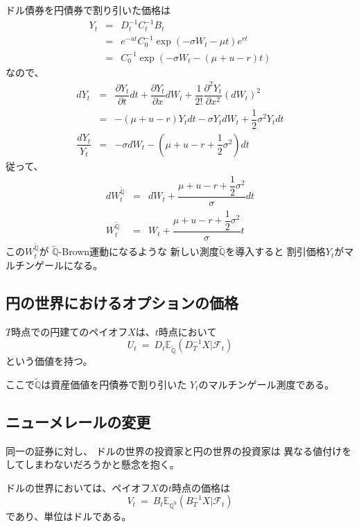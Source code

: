 \documentclass[uplatex,a4j,12pt,dvipdfmx]{jsarticle}
\begin{document}
ドル債券を円債券で割り引いた価格は
%
%
\begin{eqnarray*}
	Y_{t}
	&=&
	D^{-1}_{t}
	C^{-1}_{t}
	B_{t}
	\\ &=&
	e^{-ut}
	C_{0}^{-1}
	\exp ( - \sigma W_{t} - \mu t )
	e^{rt}
	\\ &=&
	C_{0}^{-1}
	\exp ( - \sigma W_{t} - (\mu + u -r) t )
\end{eqnarray*}
%
%
なので、
%
%
\begin{eqnarray*}
	d Y_{t}
	&=&
	\dfrac{\partial Y_{t}}{\partial t} dt
	+
	\dfrac{\partial Y_{t}}{\partial x} dW_{t}
	+
	\dfrac{1}{2!}
	\dfrac{\partial^{2} Y_{t}}{\partial x^{2}} (dW_{t})^{2}
	\\ &=&
	- (\mu + u -r) Y_{t} dt
	- \sigma Y_{t} d W_{t}
	+ \dfrac{1}{2} \sigma^{2} Y_{t} dt
	\\[3mm]
	\dfrac{dY_{t}}{Y_{t}}
	&=&
	- \sigma d W_{t}
	- \left( \mu + u -r + \dfrac{1}{2} \sigma^{2} \right) dt
\end{eqnarray*}
%
%
従って、
%
%
\begin{eqnarray*}
	d W^{\tilde{\mathbb{Q}}}_{t}
	&=&
	d W_{t}
	+
	\dfrac{\mu + u -r + \dfrac{1}{2} \sigma^{2}}{\sigma} dt
	\\
	W^{\tilde{\mathbb{Q}}}_{t}
	&=&
	W_{t}
	+
	\dfrac{\mu + u -r + \dfrac{1}{2} \sigma^{2}}{\sigma} t
\end{eqnarray*}
%
%
この$W^{\tilde{\mathbb{Q}}}_{t}$が
$\tilde{\mathbb{Q}}$-Brown運動になるような
新しい測度$\tilde{\mathbb{Q}}$を導入すると
割引価格$Y_{t}$がマルチンゲールになる。
\subsection*{円の世界におけるオプションの価格}

$T$時点での円建てのペイオフ$X$は、$t$時点において
$$
	U_{t}
	\ = \
	D_{t}
	\mathbb{E}_{\tilde{\mathbb{Q}}}
	( D^{-1}_{T} X | \mathcal{F}_{t} )
$$
という価値を持つ。

ここで$\tilde{\mathbb{Q}}$は資産価値を円債券で割り引いた
$Y_{t}$のマルチンゲール測度である。
\subsection{ニューメレールの変更}

同一の証券に対し、
ドルの世界の投資家と円の世界の投資家は
異なる値付けをしてしまわないだろうかと懸念を抱く。

ドルの世界においては、ペイオフ$X$の$t$時点の価格は
$$
	V_{t}
	\ = \
	B_{t}
	\mathbb{E}_{\mathbb{Q}^{\$}}
	( B^{-1}_{T} X | \mathcal{F}_{t} )
$$
であり、単位はドルである。
\end{document}
